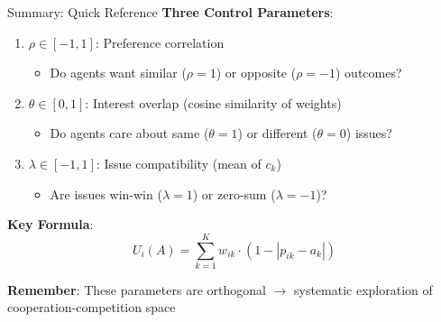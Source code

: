 \documentclass{beamer}
\begin{document}
\begin{frame}{Summary: Quick Reference}
\textbf{Three Control Parameters}:

\begin{enumerate}
    \item \textbf{$\rho \in [-1,1]$}: Preference correlation
    \begin{itemize}
        \item Do agents want similar ($\rho=1$) or opposite ($\rho=-1$) outcomes?
    \end{itemize}
    
    \item \textbf{$\theta \in [0,1]$}: Interest overlap (cosine similarity of weights)
    \begin{itemize}
        \item Do agents care about same ($\theta=1$) or different ($\theta=0$) issues?
    \end{itemize}
    
    \item \textbf{$\lambda \in [-1,1]$}: Issue compatibility (mean of $c_k$)
    \begin{itemize}
        \item Are issues win-win ($\lambda=1$) or zero-sum ($\lambda=-1$)?
    \end{itemize}
\end{enumerate}

\vspace{0.5cm}

\textbf{Key Formula}:
\begin{equation*}
U_i(A) = \sum_{k=1}^{K} w_{ik} \cdot (1 - |p_{ik} - a_k|)
\end{equation*}

\textbf{Remember}: These parameters are orthogonal $\rightarrow$ systematic exploration of cooperation-competition space
\end{frame}
\end{document}
